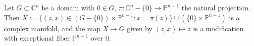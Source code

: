 Let $G \subset \mathbb{C}^n$ be a domain with $0 \in G$, $\pi: \mathbb{C}^n - \{0\} \to \mathbb{P}^{n-1}$ the natural projection. Then $X := \{(z, x) \in (G - \{0\}) \times \mathbb{P}^{n-1}: x = \pi(z)\} \cup (\{0\} \times \mathbb{P}^{n-1})$ is a complex manifold, and the map $X \to G$ given by $(z, x) \mapsto z$ is a modification with exceptional fiber $\mathbb{P}^{n-1}$ over $0$.
